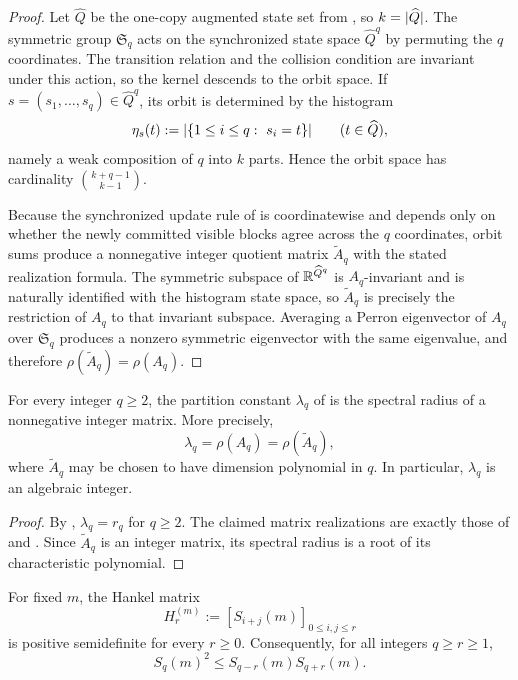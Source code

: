 \begin{proof}
Let \(\widehat Q\) be the one-copy augmented state set from
, so \(k=\lvert \widehat Q \rvert\).  The
symmetric group \(\mathfrak S_q\) acts on the synchronized state space
\(\widehat Q^q\) by permuting the \(q\) coordinates.  The transition relation
and the collision condition are invariant under this action, so the kernel
descends to the orbit space.  If \(s=(s_1,\dots,s_q)\in \widehat Q^q\), its
orbit is determined by the histogram
\[
  \eta_s(t):=\lvert \{1\le i\le q:\ s_i=t\} \rvert
  \qquad (t\in \widehat Q),
\]
namely a weak composition of \(q\) into \(k\) parts.  Hence the orbit space has
cardinality \(\binom{k+q-1}{k-1}\).

Because the synchronized update rule of
 is coordinatewise and depends only on
whether the newly committed visible blocks agree across the \(q\) coordinates,
orbit sums produce a nonnegative integer quotient matrix \(\widetilde A_q\)
with the stated realization formula.  The symmetric subspace of
\(\mathbb{R}^{\widehat Q^q}\) is \(A_q\)-invariant and is naturally identified with
the histogram state space, so \(\widetilde A_q\) is precisely the restriction
of \(A_q\) to that invariant subspace.  Averaging a Perron eigenvector of
\(A_q\) over \(\mathfrak S_q\) produces a nonzero symmetric eigenvector with
the same eigenvalue, and therefore \(\rho(\widetilde A_q)=\rho(A_q)\).
\end{proof}

\begin{corollary}
\label{cor:lambda-algebraic}
For every integer \(q\ge 2\), the partition constant \(\lambda_q\) of
 is the spectral radius of a nonnegative integer
matrix.  More precisely,
\[
  \lambda_q=\rho(A_q)=\rho(\widetilde A_q),
\]
where \(\widetilde A_q\) may be chosen to have dimension polynomial in \(q\).
In particular, \(\lambda_q\) is an algebraic integer.
\end{corollary}

\begin{proof}
By , \(\lambda_q=r_q\) for \(q\ge 2\).  The claimed
matrix realizations are exactly those of  and
.  Since \(\widetilde A_q\) is an integer
matrix, its spectral radius is a root of its characteristic polynomial.
\end{proof}

\begin{proposition}
\label{prop:hankel-psd}
For fixed \(m\), the Hankel matrix
\[
  H_r^{(m)}:=[S_{i+j}(m)]_{0\le i,j\le r}
\]
is positive semidefinite for every \(r\ge 0\).  Consequently, for all integers
\(q\ge r\ge 1\),
\[
  S_q(m)^2\le S_{q-r}(m)S_{q+r}(m).
\]
\end{proposition}

